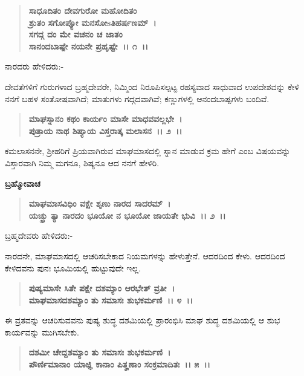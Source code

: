 \begin{verse}
\textbf{ಸಾಧೂದಿತಂ ದೇವಗುರೋ ಮಹೋದಿತಂ}\\\textbf{ಶ್ರುತಂ ಸಗೋಪ್ಯೋ ಮನಸೋsತಿಹರ್ಷಣಮ್~।}\\\textbf{ಸಗದ್ಗ ದಂ ಮೇ ವಚನಂ ಚ ಜಾತಂ}\\\textbf{ಸಾನಂದಬಾಷ್ಪೇ ನಯನೇ ಪ್ರಹೃಷ್ಟೇ~।। ೧~।।}
\end{verse}

\begin{flushleft}
ನಾರದರು ಹೇಳಿದರು:-
\end{flushleft}

ದೇವತೆಗಳಿಗೆ ಗುರುಗಳಾದ ಬ್ರಹ್ಮದೇವರೇ, ನಿಮ್ಮಿಂದ ನಿರೂಪಿಸಲ್ಪಟ್ಟ ರಹಸ್ಯವಾದ ಸಾಧುವಾದ ಉಪದೇಶವನ್ನು ಕೇಳಿ ನನಗೆ ಬಹಳ ಸಂತೋಷವಾಗಿದೆ; ಮಾತುಗಳು ಗದ್ಗದವಾಗಿವೆ; ಕಣ್ಣುಗಳಲ್ಲಿ ಆನಂದಬಾಷ್ಪಗಳು ಬಂದಿವೆ.

\begin{verse}
\textbf{ಮಾಘಸ್ನಾನಂ ಕಥಂ ಕಾರ್ಯಂ ಮಾಸೇ ಮಾಧವವಲ್ಲಭೇ~।}\\\textbf{ಪುತ್ರಾಯ ನಾಥ ಶಿಷ್ಯಾಯ ವಿಸ್ತರಾತ್ಕ ಮಲಾಸನ~।। ೨~।।}
\end{verse}

ಕಮಲಾಸನನೇ, ಶ‍್ರೀಹರಿಗೆ ಪ್ರಿಯವಾಗಿರುವ ಮಾಘಮಾಸದಲ್ಲಿ ಸ್ನಾನ ಮಾಡುವ ಕ್ರಮ ಹೇಗೆ ಎಂಬ ವಿಷಯವನ್ನು ವಿಸ್ತಾರವಾಗಿ ನಿಮ್ಮ ಮಗನೂ, ಶಿಷ್ಯನೂ ಆದ ನನಗೆ ಹೇಳಿರಿ.

\begin{flushleft}
\textbf{ಬ್ರಹ್ಮೋವಾಚ \enginline{-}}
\end{flushleft}

\begin{verse}
\textbf{ಮಾಘಮಾಸವಿಧಿಂ ವಕ್ಷೇ ಶೃಣು ನಾರದ ಸಾದರಮ್~।}\\\textbf{ಯಚ್ಛ್ರು ತ್ಯಾ ನಾರದಂ ಭೂಯೋ ನ ಭೂಯೋ ಜಾಯತೇ ಭುವಿ~।। ೨~।।}
\end{verse}

\begin{flushleft}
ಬ್ರಹ್ಮದೇವರು ಹೇಳಿದರು:-
\end{flushleft}

ನಾರದನೇ, ಮಾಘಮಾಸದಲ್ಲಿ ಆಚರಿಸಬೇಕಾದ ನಿಯಮಗಳನ್ನು ಹೇಳುತ್ತೇನೆ. ಆದರದಿಂದ ಕೇಳು. ಆದರದಿಂದ ಕೇಳಿದವನು ಪುನಃ ಭೂಮಿಯಲ್ಲಿ ಹುಟ್ಟುವುದೇ ಇಲ್ಲ.

\begin{verse}
\textbf{ಪುಷ್ಯಮಾಸೇ ಸಿತೇ ಪಕ್ಷೇ ದಶಮ್ಯಾಂ ಆರಭೇತ್ ವ್ರತೀ~।}\\\textbf{ಮಾಘಮಾಸದಶಮ್ಯಾಂ ತು ಸಮಾಸಃ ಶುಭಕರ್ಮಣಿ~।। ೪~।।}
\end{verse}

ಈ ವ್ರತವನ್ನು ಆಚರಿಸುವವನು ಪುಷ್ಯ ಶುದ್ಧ ದಶಮಿಯಲ್ಲಿ ಪ್ರಾರಂಭಿಸಿ ಮಾಘ ಶುದ್ಧ ದಶಮಿಯಲ್ಲಿ ಆ ಶುಭ ಕಾರ್ಯವನ್ನು ಮುಗಿಸಬೇಕು.

\begin{verse}
\textbf{ದಶಮೀ ಚೇದ್ದಶಮ್ಯಾಂ ತು ಸಮಾಸಃ ಶುಭಕರ್ಮಣಿ~।}\\\textbf{ಪೌರ್ಣಿಮಾನಾಂ ಯಾಜ್ಞಿ ಕಾನಾಂ ಪಿತೄಣಾಂ ಸಂಕ್ರಮಾದಿತಃ~।। ೫~।।}
\end{verse}

